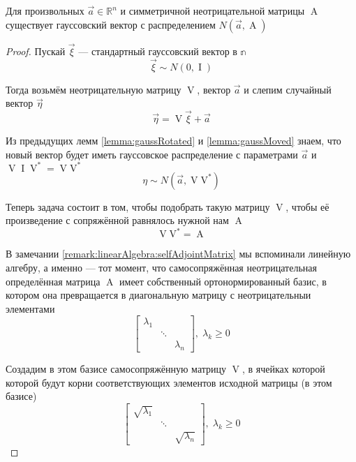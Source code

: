 \begin{theorem}\label{theorem:gaussianVectorExistance}
    Для произвольных $\vec{a} \in \mathbb{R}^n$ и симметричной неотрицательной
    матрицы $\operatorname{A}$ существует гауссовский вектор с распределением
    $N\left( \vec{a}, \operatorname{A} \right)$
\end{theorem}
\begin{proof}
    Пускай $\vec{\xi}$ --- стандартный гауссовский вектор в $\mathbb{n}$
    $$\vec{\xi} \sim N\left( 0, \operatorname{I} \right)$$

    Тогда возьмём неотрицательную матрицу $\operatorname{V}$, вектор $\vec{a}$ и
    слепим случайный вектор $\vec{\eta}$
    $$\vec{\eta} = \operatorname{V} \vec{\xi} + \vec{a}$$

    Из предыдущих лемм \ref{lemma:gaussRotated} и \ref{lemma:gaussMoved}
    знаем, что новый вектор будет иметь гауссовское распределение с параметрами
    $\vec{a}$ и $\operatorname{V} \operatorname{I} \operatorname{V}^* 
    = \operatorname{V} \operatorname{V^*} $
    $$\eta \sim N\left( \vec{a}, \operatorname{V} \operatorname{V^*} \right)$$

    Теперь задача состоит в том, чтобы подобрать такую матрицу $\operatorname{V}$,
    чтобы её произведение с сопряжённой равнялось нужной нам $\operatorname{A}$
    $$\operatorname{V} \operatorname{V^*} = \operatorname{A}$$

    В замечании \ref{remark:linearAlgebra:selfAdjointMatrix} мы вспоминали
    линейную алгебру, а именно --- тот момент, что самосопряжённая
    неотрицательная определённая матрица $\operatorname{A}$ имеет собственный
    ортонормированный базис, в котором она превращается в диагональную матрицу
    с неотрицательныи элементами
    $$
    \begin{bmatrix}
        \lambda_1 & & \\
        & \ddots &  \\
        & & \lambda_n
    \end{bmatrix},\;
        \lambda_k \ge 0$$

    Создадим в этом базисе самосопряжённую матрицу $\operatorname{V}$, в ячейках
    которой которой будут корни соответствующих элементов исходной матрицы
    (в этом базисе)
    $$
    \begin{bmatrix}
        \sqrt{\lambda_1} & & \\
        & \ddots &  \\
        & & \sqrt{\lambda_n}
    \end{bmatrix},\; \lambda_k \ge 0$$


\end{proof}
